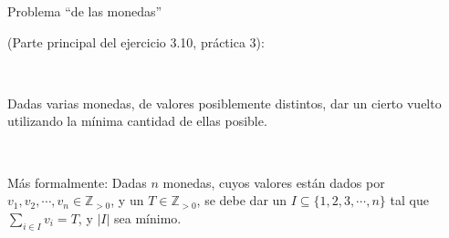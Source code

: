 \documentclass{beamer}
\begin{document}
\begin{frame}{Problema ``de las monedas''}

\small

	(Parte principal del ejercicio 3.10, práctica 3):
    
\ 

	Dadas varias monedas, de valores posiblemente distintos, dar un cierto vuelto utilizando la mínima cantidad de ellas posible.
    
\ 
    
    Más formalmente: Dadas $n$ monedas, cuyos valores están dados por $v_1, v_2, \cdots, v_n \in \mathbb{Z}_{>0}$, y un $T \in \mathbb{Z}_{>0}$, se debe dar un $I \subseteq \{1,2,3, \cdots, n \}$ tal que
    $\sum_{i \in I}{v_i} = T$, y $|I|$ sea mínimo.
    
%
\end{frame}
\end{document}
